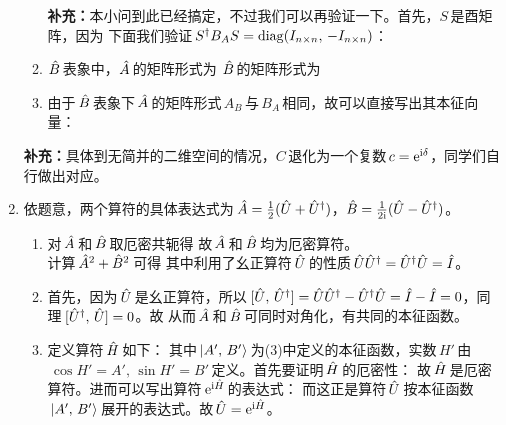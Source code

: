 \begin{enumerate}[label=2.\arabic*, leftmargin=-0.5mm]
\begin{enumerate}[label=(\arabic*)]
\textbf{补充：}本小问到此已经搞定，不过我们可以再验证一下。首先，$S\,$是酉矩阵，因为 
下面我们验证$\,S^\dagger B_AS=\mathrm{diag}(I_{n\times n},\,-I_{n\times n})$：
\setcounter{enumii}{1}
\item
$\hat{B}\,$表象中，$\hat{A}\,$的矩阵形式为
$\hat{B}\,$的矩阵形式为
\setcounter{enumii}{3}
\item
由于$\,\hat{B}\,$表象下$\,\hat{A}\,$的矩阵形式$\,A_B\,$与$\,B_A\,$相同，故可以直接写出其本征向量：
\end{enumerate}
\textbf{补充：}具体到无简并的二维空间的情况，$C\,$退化为一个复数$\,c=\mathrm{e}^{\mathrm{i}\delta}$，同学们自行做出对应。

\item
依题意，两个算符的具体表达式为$\,\hat{A}=\frac{1}{2}(\hat{U}+\hat{U}^\dagger)$，$\hat{B}=\frac{1}{2\mathrm{i}}(\hat{U}-\hat{U}^\dagger)$。
\begin{enumerate}[label=(\arabic*)]
    \item 对$\,\hat{A}\,$和$\,\hat{B}\,$取厄密共轭得
    故$\,\hat{A}\,$和$\,\hat{B}\,$均为厄密算符。\\
    计算$\,\hat{A}^2+\hat{B}^2\,$可得
    其中利用了幺正算符$\,\hat{U}\,$的性质$\,\hat{U}\hat{U}^\dagger=\hat{U}^\dagger\hat{U}=\hat{I}$。
    \item 
    首先，因为$\,\hat{U}\,$是幺正算符，所以$\,[\hat{U},\,\hat{U}^\dagger]=\hat{U}\hat{U}^\dagger-\hat{U}^\dagger\hat{U}=\hat{I}-\hat{I}=0$，同理$\,[\hat{U}^\dagger,\,\hat{U}]=0$。故
    从而$\,\hat{A}\,$和$\,\hat{B}\,$可同时对角化，有共同的本征函数。
    \setcounter{enumii}{4}
    \item
    定义算符$\,\hat{H}\,$如下：
    其中$\,\ket{A',\,B'}\,$为(3)中定义的本征函数，实数$\,H'\,$由$\,\cos H'=A',\,\sin H'=B'\,$定义。首先要证明$\,\hat{H}\,$的厄密性：
    故$\,\hat{H}\,$是厄密算符。进而可以写出算符$\,\mathrm{e}^{\mathrm{i}\hat{H}}\,$的表达式：
    而这正是算符$\,\hat{U}\,$按本征函数$\,\ket{A',\,B'}\,$展开的表达式。故$\,\hat{U}=\mathrm{e}^{\mathrm{i}\hat{H}}$。
\end{enumerate}

\end{enumerate}
